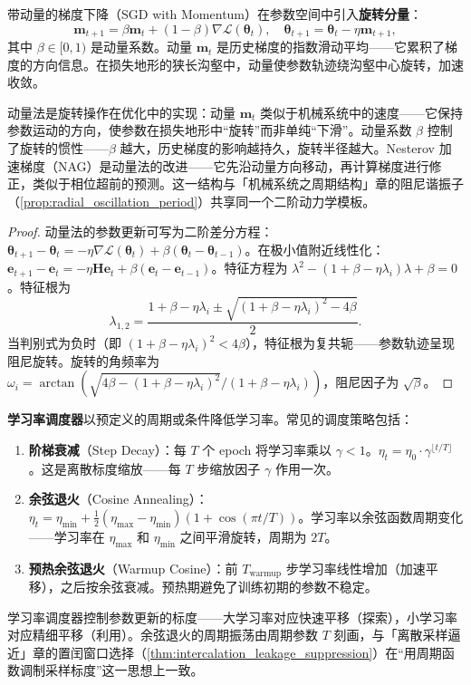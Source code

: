 \begin{proposition}[动量法的旋转加速]\label{prop:momentum_rotation}
带动量的梯度下降（SGD with Momentum）在参数空间中引入\textbf{旋转分量}：
\[
\mathbf{m}_{t+1} = \beta \mathbf{m}_t + (1-\beta) \nabla \mathcal{L}(\boldsymbol{\theta}_t), \quad \boldsymbol{\theta}_{t+1} = \boldsymbol{\theta}_t - \eta \mathbf{m}_{t+1},
\]
其中 $\beta \in [0,1)$ 是动量系数。动量 $\mathbf{m}_t$ 是历史梯度的指数滑动平均——它累积了梯度的方向信息。在损失地形的狭长沟壑中，动量使参数轨迹绕沟壑中心旋转，加速收敛。

动量法是旋转操作在优化中的实现：动量 $\mathbf{m}_t$ 类似于机械系统中的速度——它保持参数运动的方向，使参数在损失地形中“旋转”而非单纯“下滑”。动量系数 $\beta$ 控制了旋转的惯性——$\beta$ 越大，历史梯度的影响越持久，旋转半径越大。Nesterov 加速梯度（NAG）是动量法的改进——它先沿动量方向移动，再计算梯度进行修正，类似于相位超前的预测。这一结构与「机械系统之周期结构」章的阻尼谐振子（\cref{prop:radial_oscillation_period}）共享同一个二阶动力学模板。
\end{proposition}

\begin{proof}
动量法的参数更新可写为二阶差分方程：$\boldsymbol{\theta}_{t+1} - \boldsymbol{\theta}_t = -\eta \nabla \mathcal{L}(\boldsymbol{\theta}_t) + \beta(\boldsymbol{\theta}_t - \boldsymbol{\theta}_{t-1})$。在极小值附近线性化：$\mathbf{e}_{t+1} - \mathbf{e}_t = -\eta \mathbf{H} \mathbf{e}_t + \beta(\mathbf{e}_t - \mathbf{e}_{t-1})$。特征方程为 $\lambda^2 - (1+\beta - \eta \lambda_i)\lambda + \beta = 0$。特征根为
\[
\lambda_{1,2} = \frac{1+\beta - \eta \lambda_i \pm \sqrt{(1+\beta - \eta \lambda_i)^2 - 4\beta}}{2}.
\]
当判别式为负时（即 $(1+\beta-\eta\lambda_i)^2 < 4\beta$），特征根为复共轭——参数轨迹呈现阻尼旋转。旋转的角频率为 $\omega_i = \arctan(\sqrt{4\beta - (1+\beta - \eta \lambda_i)^2}/(1+\beta - \eta \lambda_i))$，阻尼因子为 $\sqrt{\beta}$。
\end{proof}

\begin{definition}[学习率调度器的周期衰减]\label{def:lr_scheduler}
\textbf{学习率调度器}以预定义的周期或条件降低学习率。常见的调度策略包括：
\begin{enumerate}[label=(\roman*)]
    \item \textbf{阶梯衰减}（Step Decay）：每 $T$ 个 epoch 将学习率乘以 $\gamma < 1$。$\eta_t = \eta_0 \cdot \gamma^{\lfloor t/T \rfloor}$。这是离散标度缩放——每 $T$ 步缩放因子 $\gamma$ 作用一次。
    \item \textbf{余弦退火}（Cosine Annealing）：$\eta_t = \eta_{\min} + \frac{1}{2}(\eta_{\max} - \eta_{\min})(1 + \cos(\pi t/T))$。学习率以余弦函数周期变化——学习率在 $\eta_{\max}$ 和 $\eta_{\min}$ 之间平滑旋转，周期为 $2T$。
    \item \textbf{预热余弦退火}（Warmup Cosine）：前 $T_{\text{warmup}}$ 步学习率线性增加（加速平移），之后按余弦衰减。预热期避免了训练初期的参数不稳定。
\end{enumerate}
学习率调度器控制参数更新的标度——大学习率对应快速平移（探索），小学习率对应精细平移（利用）。余弦退火的周期振荡由周期参数 $T$ 刻画，与「离散采样逼近」章的置闰窗口选择（\cref{thm:intercalation_leakage_suppression}）在“用周期函数调制采样标度”这一思想上一致。
\end{definition}

